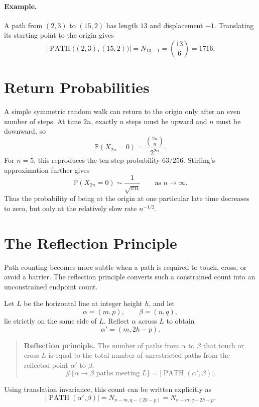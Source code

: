 \documentclass[12pt,openany]{book}
\theoremstyle{definition}
\theoremstyle{remark}
\begin{document}
\paragraph{Example.}
A path from \((2,3)\) to \((15,2)\) has length \(13\) and displacement
\(-1\). Translating its starting point to the origin gives
\[
\left|
\operatorname{PATH}\bigl((2,3),(15,2)\bigr)
\right|
=N_{13,-1}
=\binom{13}{6}
=1716.
\]

\section{Return Probabilities}

A simple symmetric random walk can return to the origin only after an even
number of steps. At time \(2n\), exactly \(n\) steps must be upward and \(n\)
must be downward, so
\[
\boxed{
\mathbb{P}(X_{2n}=0)
=\frac{\binom{2n}{n}}{2^{2n}}
}.
\]
For \(n=5\), this reproduces the ten-step probability \(63/256\). Stirling's
approximation further gives
\[
\mathbb{P}(X_{2n}=0)
\sim\frac{1}{\sqrt{\pi n}}
\qquad\text{as }n\to\infty.
\]
Thus the probability of being at the origin at one particular late time
decreases to zero, but only at the relatively slow rate \(n^{-1/2}\).

\section{The Reflection Principle}

Path counting becomes more subtle when a path is required to touch, cross,
or avoid a barrier. The reflection principle converts such a constrained
count into an unconstrained endpoint count.

Let \(L\) be the horizontal line at integer height \(h\), and let
\[
\alpha=(m,p),
\qquad
\beta=(n,q),
\]
lie strictly on the same side of \(L\). Reflect \(\alpha\) across \(L\) to
obtain
\[
\alpha'=(m,2h-p).
\]

\begin{quote}
\colorbox{diagramBlue!8}{%
\parbox{\dimexpr\linewidth-2\fboxsep\relax}{%
\textbf{Reflection principle.} The number of paths from \(\alpha\) to
\(\beta\) that touch or cross \(L\) is equal to the total number of
unrestricted paths from the reflected point \(\alpha'\) to \(\beta\):
\[
\#\{\alpha\to\beta\text{ paths meeting }L\}
=\left|\operatorname{PATH}(\alpha',\beta)\right|.
\]}}
\end{quote}

Using translation invariance, this count can be written explicitly as
\[
\left|\operatorname{PATH}(\alpha',\beta)\right|
=N_{n-m,q-(2h-p)}
=N_{n-m,q-2h+p}.
\]
\end{document}
